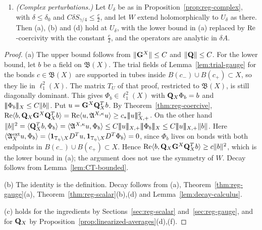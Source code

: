 \begin{proposition}
\begin{enumerate}[label=(\alph*)]
\item \emph{(Complex perturbations.)} Let $U_\delta$ be as in Proposition~\ref{prop:reg-complex}, with $\delta\le\delta_0$ and $C\delta S_{\gamma/4}\le\frac c2$, and let $W$ extend holomorphically to $U_\delta$ as there. Then (a), (b) and (d) hold at $U_\delta$, with the lower bound in (a) replaced by $\operatorname{Re}$-coercivity with the constant $\frac c2$, and the operators are analytic in $\delta\!A$.
\end{enumerate}
\end{proposition}

\begin{proof}
(a) The upper bound follows from $\|\mathbf G^X\|\le C$ and $\|\mathbf Q\|\le C$. For the lower bound, let $b$ be a field on $\mathfrak B(X)$. The trial fields of Lemma~\ref{lem:trial-gauge} for the bonds $c\in\mathfrak B(X)$ are supported in tubes inside $B(c_-)\cup B(c_+)\subset X$, so they lie in $\ell^2_1(X)$. The matrix $T_U$ of that proof, restricted to $\mathfrak B(X)$, is still diagonally dominant. This gives $\Phi_b\in\ell^2_1(X)$ with $\mathbf Q_X\Phi_b=b$ and $|\!|\!|\Phi_b|\!|\!|_X\le C\|b\|$. Put $u=\mathbf G^X\mathbf Q_X^Tb$. By Theorem~\ref{thm:reg-coercive}, $\operatorname{Re}\langle b,\mathbf Q_X\mathbf G^X\mathbf Q_X^Tb\rangle=\operatorname{Re}\langle u,\mathfrak A^{X,\kappa}u\rangle\ge c_*|\!|\!|u|\!|\!|_{X,+}^2$. On the other hand $\|b\|^2=\ip{\bQ_X^Tb}{\Phi_b}=\ip{\fA^{X,\kappa}u}{\Phi_b}\le C\tn u_{X,+}\tn{\Phi_b}_X\le C\tn u_{X,+}\|b\|$. Here $\langle \mathfrak A^{\rm ext}_Xu,\Phi_b\rangle=\langle \mathbf 1_{\mathbb T_\eta\setminus X}D^Tu,\mathbf 1_{\mathbb T_\eta\setminus X}D^T\Phi_b\rangle=0$, since $\Phi_b$ lives on bonds with both endpoints in $B(c_-)\cup B(c_+)\subset X$. Hence $\operatorname{Re}\langle b,\mathbf Q_X\mathbf G^X\mathbf Q_X^Tb\rangle\ge c\|b\|^2$, which is the lower bound in (a); the argument does not use the symmetry of $W$. Decay follows from Lemma~\ref{lem:CT-bounded}.

(b) The identity is the definition. Decay follows from (a), Theorem~\ref{thm:reg-gauge}(a), Theorem~\ref{thm:reg-scalar}(b),(d) and Lemma~\ref{lem:decay-calculus}.

(c) holds for the ingredients by Sections~\ref{sec:reg-scalar} and~\ref{sec:reg-gauge}, and for $\mathbf Q_X$ by Proposition~\ref{prop:linearized-averages}(d),(f).


\end{proof}

